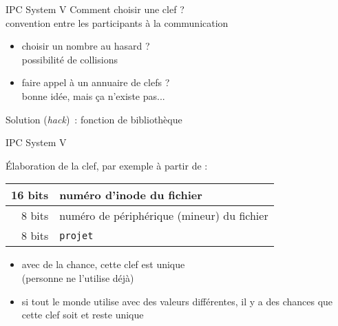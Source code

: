 \begin {frame} {IPC System V}
    Comment choisir une clef ? \\
    \implique convention entre les participants à la
    communication

    \begin {itemize}
	\item choisir un nombre au hasard ? \\
	    \implique possibilité de collisions

	\item faire appel à un annuaire de clefs ? \\
	    \implique bonne idée, mais ça n'existe pas...
    \end {itemize}

    Solution (\textit {hack})~: fonction de bibliothèque 

\end {frame}

\begin {frame} {IPC System V}

    \vspace* {3mm}

    Élaboration de la clef, par exemple à partir de :
    \begin {center}
    \begin {tabular} {|r|l|} \hline
	16 bits & numéro d'inode du fichier \\ \hline
	8 bits & numéro de périphérique (mineur) du fichier \\ \hline
	8 bits & \texttt {projet} \\ \hline
    \end {tabular}
    \end {center}

    \vspace* {3mm}

    \begin {itemize}
	\item avec de la chance, cette clef est unique
	    \\
	    (personne ne l'utilise déjà)
	\item si tout le monde utilise  avec des valeurs
	    différentes, il y a des chances que cette clef soit et reste unique
    \end {itemize}


\end {frame}

